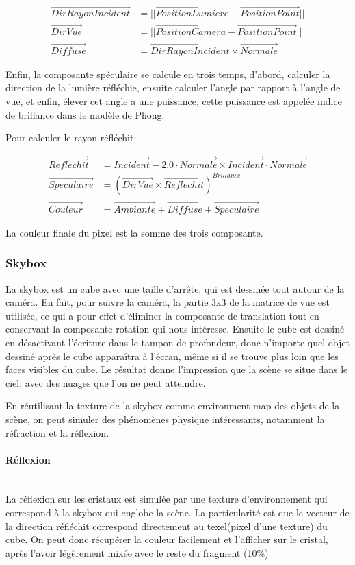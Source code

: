 \documentclass[pdftex, 11pt, a4paper, titlepage]{article}
\newcommand{\vect}[1]{\overrightarrow{#1}}
\begin{document}
\begin{align*}
  \vect{DirRayonIncident} &= ||\vect{PositionLumiere} -  \vect{PositionPoint}||\\
  \vect{DirVue} &= ||\vect{PositionCamera} -  \vect{PositionPoint}|| \\
  \vect{Diffuse} &= \vect{DirRayonIncident} \times \vect{Normale}
\end{align*}

Enfin, la composante spéculaire se calcule en trois temps, d'abord, calculer
la direction de la lumière réfléchie, ensuite calculer l'angle par rapport à 
l'angle de vue, et enfin, élever cet angle a une puissance, cette puissance
est appelée indice de brillance dans le modèle de Phong.

Pour calculer le rayon réfléchit:

\begin{align*}
\vect{Reflechit} &= \vect{Incident} - 2.0 \cdot \vect{Normale} \times \vect{Incident} \cdot \vect{Normale} \\
\vect{Speculaire} &= (\vect{DirVue} \times  \vect{Reflechit})^{Brillance} \\
\vect{Couleur} &= \vect{Ambiante} + \vect{Diffuse} + \vect{Speculaire}
\end{align*}

La couleur finale du pixel est la somme des trois composante.

\subsubsection{Skybox}

La skybox est un cube avec une taille d'arrête, qui est dessinée tout
 autour de la caméra. En fait, pour suivre la caméra, la partie 3x3 de 
la matrice de vue est utilisée, ce qui a pour effet d'éliminer la
 composante de translation tout en conservant la composante rotation 
qui nous intéresse. Ensuite le cube est dessiné en désactivant l'écriture
 dans le tampon de profondeur, donc n'importe quel objet dessiné après le 
cube apparaîtra à l'écran, même si il se trouve plus loin que les faces
 visibles du cube. Le résultat donne l'impression que la scène se situe
 dans le ciel, avec des nuages que l'on ne peut atteindre.

En réutilisant la texture de la skybox comme environment map des objets 
de la scène, on peut simuler des phénomènes physique intéressants, 
notamment la réfraction et la réflexion.

\paragraph{Réflexion}\mbox{}\\
La réflexion sur les cristaux est simulée par une texture d'environnement 
qui correspond à la skybox qui englobe la scène.
La particularité est que le vecteur de la direction réfléchit correspond 
directement au texel(pixel d'une texture) du cube. On peut donc récupérer
 la couleur facilement et l'afficher sur le cristal, après
l'avoir légèrement mixée avec le reste du fragment (10\%)
\end{document}
